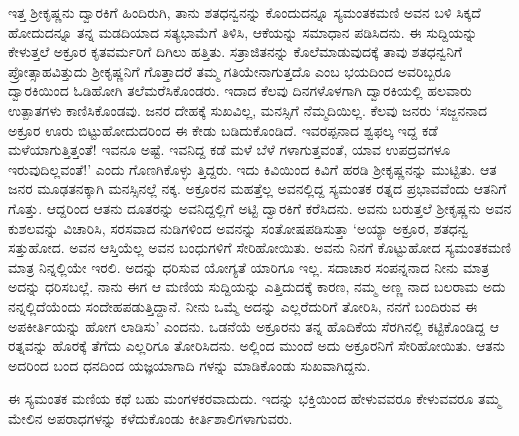 ಇತ್ತ ಶ್ರೀಕೃಷ್ಣನು ದ್ವಾರಕಿಗೆ ಹಿಂದಿರುಗಿ, ತಾನು ಶತಧನ್ವನನ್ನು ಕೊಂದುದನ್ನೂ ಸ್ಯಮಂತಕಮಣಿ ಅವನ ಬಳಿ ಸಿಕ್ಕದೆ ಹೋದುದನ್ನೂ ತನ್ನ ಮಡದಿಯಾದ ಸತ್ಯಭಾಮೆಗೆ ತಿಳಿಸಿ, ಆಕೆಯನ್ನು ಸಮಾಧಾನ ಪಡಿಸಿದನು. ಈ ಸುದ್ದಿಯನ್ನು ಕೇಳುತ್ತಲೆ ಅಕ್ರೂರ ಕೃತವರ್ಮರಿಗೆ ದಿಗಿಲು ಹತ್ತಿತು. ಸತ್ರಾಜಿತನನ್ನು ಕೊಲೆಮಾಡುವುದಕ್ಕೆ ತಾವು ಶತಧನ್ವನಿಗೆ ಪ್ರೋತ್ಸಾಹವಿತ್ತುದು ಶ್ರೀಕೃಷ್ಣನಿಗೆ ಗೊತ್ತಾದರೆ ತಮ್ಮ ಗತಿಯೇನಾಗುತ್ತದೊ ಎಂಬ ಭಯದಿಂದ ಅವರಿಬ್ಬರೂ ದ್ವಾರಕಿಯಿಂದ ಓಡಿಹೋಗಿ ತಲೆಮರೆಸಿಕೊಂಡರು. ಇದಾದ ಕೆಲವು ದಿನಗಳೊಳಗಾಗಿ ದ್ವಾರಕಿಯಲ್ಲಿ ಹಲವಾರು ಉತ್ಪಾತಗಳು ಕಾಣಿಸಿಕೊಂಡವು. ಜನರ ದೇಹಕ್ಕೆ ಸುಖವಿಲ್ಲ, ಮನಸ್ಸಿಗೆ ನೆಮ್ಮದಿಯಿಲ್ಲ. ಕೆಲವು ಜನರು ‘ಸಜ್ಜನನಾದ ಅಕ್ರೂರ ಊರು ಬಿಟ್ಟುಹೋದುದರಿಂದ ಈ ಕೇಡು ಬಡಿದುಕೊಂಡಿದೆ. ಇವರಪ್ಪನಾದ ಶ್ವಫಲ್ಕ ಇದ್ದ ಕಡೆ ಮಳೆಯಾಗುತ್ತಿತ್ತಂತೆ! ಇವನೂ ಅಷ್ಟೆ. ಇವನಿದ್ದ ಕಡೆ ಮಳೆ ಬೆಳೆ ಗಳಾಗುತ್ತವಂತೆ, ಯಾವ ಉಪದ್ರವಗಳೂ ಇರುವುದಿಲ್ಲವಂತೆ!’ ಎಂದು ಗೊಣಗಿಕೊಳ್ಳು ತ್ತಿದ್ದರು. ಇದು ಕಿವಿಯಿಂದ ಕಿವಿಗೆ ಹರಡಿ ಶ್ರೀಕೃಷ್ಣನನ್ನು ಮುಟ್ಟಿತು. ಆತ ಜನರ ಮೂಢತನಕ್ಕಾಗಿ ಮನಸ್ಸಿನಲ್ಲೆ ನಕ್ಕ. ಅಕ್ರೂರನ ಮಹತ್ತೆಲ್ಲ ಅವನಲ್ಲಿದ್ದ ಸ್ಯಮಂತಕ ರತ್ನದ ಪ್ರಭಾವವೆಂದು ಆತನಿಗೆ ಗೊತ್ತು. ಆದ್ದರಿಂದ ಆತನು ದೂತರನ್ನು ಅವನಿದ್ದಲ್ಲಿಗೆ ಅಟ್ಟಿ ದ್ವಾರಕಿಗೆ ಕರೆಸಿದನು. ಅವನು ಬರುತ್ತಲೆ ಶ್ರೀಕೃಷ್ಣನು ಅವನ ಕುಶಲವನ್ನು ವಿಚಾರಿಸಿ, ಸರಸವಾದ ನುಡಿಗಳಿಂದ ಅವನನ್ನು ಸಂತೋಷಪಡಿಸುತ್ತಾ ‘ಅಯ್ಯಾ ಅಕ್ರೂರ, ಶತಧನ್ವ ಸತ್ತುಹೋದ. ಅವನ ಆಸ್ತಿಯೆಲ್ಲ ಅವನ ಬಂಧುಗಳಿಗೆ ಸೇರಿಹೋಯಿತು. ಅವನು ನಿನಗೆ ಕೊಟ್ಟುಹೋದ ಸ್ಯಮಂತಕಮಣಿ ಮಾತ್ರ ನಿನ್ನಲ್ಲಿಯೇ ಇರಲಿ. ಅದನ್ನು ಧರಿಸುವ ಯೋಗ್ಯತೆ ಯಾರಿಗೂ ಇಲ್ಲ. ಸದಾಚಾರ ಸಂಪನ್ನನಾದ ನೀನು ಮಾತ್ರ ಅದನ್ನು ಧರಿಸಬಲ್ಲೆ. ನಾನು ಈಗ ಆ ಮಣಿಯ ಸುದ್ದಿಯನ್ನು ಎತ್ತಿದುದಕ್ಕೆ ಕಾರಣ, ನಮ್ಮ ಅಣ್ಣ ನಾದ ಬಲರಾಮ ಅದು ನನ್ನಲ್ಲಿದೆಯೆಂದು ಸಂದೇಹಪಡುತ್ತಿದ್ದಾನೆ. ನೀನು ಒಮ್ಮೆ ಅದನ್ನು ಎಲ್ಲರೆದುರಿಗೆ ತೋರಿಸಿ, ನನಗೆ ಬಂದಿರುವ ಈ ಅಪಕೀರ್ತಿಯನ್ನು ಹೋಗ ಲಾಡಿಸು’ ಎಂದನು. ಒಡನೆಯೆ ಅಕ್ರೂರನು ತನ್ನ ಹೊದಿಕೆಯ ಸೆರಗಿನಲ್ಲಿ ಕಟ್ಟಿಕೊಂಡಿದ್ದ ಆ ರತ್ನವನ್ನು ಹೊರಕ್ಕೆ ತೆಗೆದು ಎಲ್ಲರಿಗೂ ತೋರಿಸಿದನು. ಅಲ್ಲಿಂದ ಮುಂದೆ ಅದು ಅಕ್ರೂರನಿಗೆ ಸೇರಿಹೋಯಿತು. ಆತನು ಅದರಿಂದ ಬಂದ ಧನದಿಂದ ಯಜ್ಞಯಾಗಾದಿ ಗಳನ್ನು ಮಾಡಿಕೊಂಡು ಸುಖವಾಗಿದ್ದನು.

ಈ ಸ್ಯಮಂತಕ ಮಣಿಯ ಕಥೆ ಬಹು ಮಂಗಳಕರವಾದುದು. ಇದನ್ನು ಭಕ್ತಿಯಿಂದ ಹೇಳುವವರೂ ಕೇಳುವವರೂ ತಮ್ಮ ಮೇಲಿನ ಅಪರಾಧಗಳನ್ನು ಕಳೆದುಕೊಂಡು ಕೀರ್ತಿಶಾಲಿಗಳಾಗುವರು.

